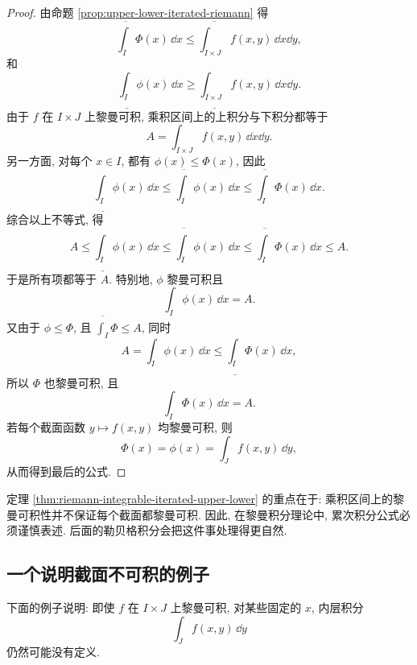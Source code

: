 \begin{proof}
	由命题 \ref{prop:upper-lower-iterated-riemann} 得
	\[
	\overline{\int_I}\Phi(x)\,\dd x
	\leq
	\overline{\int_{I\times J}}f(x,y)\,\dd x\dd y,
	\]
	和
	\[
	\underline{\int_I}\phi(x)\,\dd x
	\geq
	\underline{\int_{I\times J}}f(x,y)\,\dd x\dd y.
	\]
	由于 \(f\) 在 \(I\times J\) 上黎曼可积, 乘积区间上的上积分与下积分都等于
	\[
	A=\int_{I\times J}f(x,y)\,\dd x\dd y.
	\]
	另一方面, 对每个 \(x\in I\), 都有 \(\phi(x)\leq \Phi(x)\), 因此
	\[
	\underline{\int_I}\phi(x)\,\dd x
	\leq
	\overline{\int_I}\phi(x)\,\dd x
	\leq
	\overline{\int_I}\Phi(x)\,\dd x.
	\]
	综合以上不等式, 得
	\[
	A
	\leq
	\underline{\int_I}\phi(x)\,\dd x
	\leq
	\overline{\int_I}\phi(x)\,\dd x
	\leq
	\overline{\int_I}\Phi(x)\,\dd x
	\leq A.
	\]
	于是所有项都等于 \(A\). 特别地, \(\phi\) 黎曼可积且
	\[
	\int_I\phi(x)\,\dd x=A.
	\]
	又由于 \(\phi\leq \Phi\), 且 \(\overline{\int_I}\Phi\leq A\), 同时
	\[
	A=\int_I\phi(x)\,\dd x\leq \underline{\int_I}\Phi(x)\,\dd x,
	\]
	所以 \(\Phi\) 也黎曼可积, 且
	\[
	\int_I\Phi(x)\,\dd x=A.
	\]
	若每个截面函数 \(y\mapsto f(x,y)\) 均黎曼可积, 则
	\[
	\Phi(x)=\phi(x)=\int_J f(x,y)\,\dd y,
	\]
	从而得到最后的公式.
\end{proof}

\begin{rem}
	定理 \ref{thm:riemann-integrable-iterated-upper-lower} 的重点在于: 乘积区间上的黎曼可积性并不保证每个截面都黎曼可积. 因此, 在黎曼积分理论中, 累次积分公式必须谨慎表述. 后面的勒贝格积分会把这件事处理得更自然.
\end{rem}

\subsection{一个说明截面不可积的例子}

下面的例子说明: 即使 \(f\) 在 \(I\times J\) 上黎曼可积, 对某些固定的 \(x\), 内层积分
\[
\int_J f(x,y)\,\dd y
\]
仍然可能没有定义.

